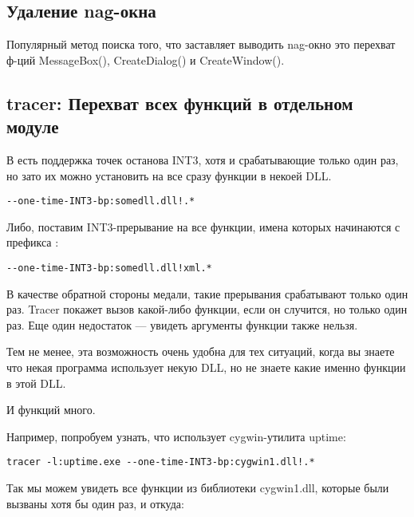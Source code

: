 \subsection{Удаление nag-окна}

Популярный метод поиска того, что заставляет выводить nag-окно это перехват ф-ций MessageBox(),
CreateDialog() и CreateWindow().

\subsection{tracer: Перехват всех функций в отдельном модуле}

В \tracer есть поддержка точек останова INT3, хотя и срабатывающие только один раз, но зато их можно установить на все
сразу функции в некоей DLL.

\begin{lstlisting}
--one-time-INT3-bp:somedll.dll!.*
\end{lstlisting}

Либо, поставим INT3-прерывание на все функции, имена которых начинаются с префикса :

\begin{lstlisting}
--one-time-INT3-bp:somedll.dll!xml.*
\end{lstlisting}

В качестве обратной стороны медали, такие прерывания срабатывают только один раз.
Tracer покажет вызов какой-либо функции, если он случится, но только один раз.
Еще один недостаток --- увидеть аргументы функции также нельзя.

Тем не менее, эта возможность очень удобна для тех ситуаций, 
когда вы знаете что некая программа использует некую DLL,
но не знаете какие именно функции в этой DLL.

И функций много. 

\par
{}
Например, попробуем узнать, что использует cygwin-утилита uptime:

\begin{lstlisting}
tracer -l:uptime.exe --one-time-INT3-bp:cygwin1.dll!.*
\end{lstlisting}

Так мы можем увидеть все функции из библиотеки cygwin1.dll, которые были вызваны хотя бы один раз, и откуда:



